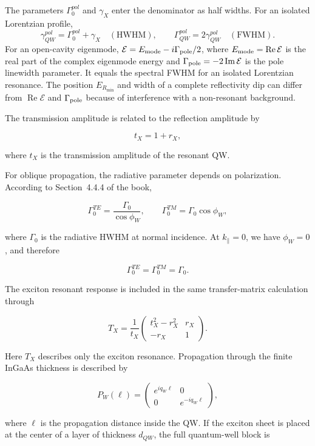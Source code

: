 \documentclass[12pt,a4paper]{article}
\begin{document}
The parameters $\Gamma_0^{pol}$ and $\gamma_X$ enter the denominator as
half widths. For an isolated Lorentzian profile,
\[
\gamma_{QW}^{pol}=\Gamma_0^{pol}+\gamma_X\quad(\mathrm{HWHM}),
\qquad
\Gamma_{QW}^{pol}=2\gamma_{QW}^{pol}\quad(\mathrm{FWHM}).
\]
For an open-cavity eigenmode,
$\mathcal E=E_{\rm mode}-i\Gamma_{\rm pole}/2$,
where $E_{\rm mode}=\operatorname{Re}\mathcal E$ is the real part of the
complex eigenmode energy and
$\Gamma_{\rm pole}=-2\operatorname{Im}\mathcal E$ is the pole linewidth
parameter. It equals the spectral FWHM for an isolated Lorentzian
resonance. The position $E_{R_{\min}}$ and width of a complete reflectivity
dip can differ from $\operatorname{Re}\mathcal E$ and
$\Gamma_{\rm pole}$ because of interference with a non-resonant background.

The transmission amplitude is related to the reflection amplitude by

\[
t_X=1+r_X,
\]

where $t_X$ is the transmission amplitude of the resonant QW.

For oblique propagation, the radiative parameter depends on polarization. According to Section~4.4.4 of the book,

\[
\Gamma_0^{TE}
=
\frac{\Gamma_0}{\cos\phi_W},
\qquad
\Gamma_0^{TM}
=
\Gamma_0\cos\phi_W,
\]

where $\Gamma_0$ is the radiative HWHM at normal incidence. At $k_\parallel=0$, we have $\phi_W=0$, and therefore

\[
\Gamma_0^{TE}=\Gamma_0^{TM}=\Gamma_0.
\]

The exciton resonant response is included in the same transfer-matrix calculation through

\[
T_X
=
\frac{1}{t_X}
\begin{pmatrix}
t_X^2-r_X^2 & r_X\\
-r_X & 1
\end{pmatrix}.
\]

Here $T_X$ describes only the exciton resonance. Propagation through the finite InGaAs thickness is described by

\[
P_W(\ell)
=
\begin{pmatrix}
e^{iq_W\ell} & 0\\
0 & e^{-iq_W\ell}
\end{pmatrix},
\]

where $\ell$ is the propagation distance inside the QW. If the exciton sheet is placed at the center of a layer of thickness $d_{QW}$, the full quantum-well block is
\end{document}
